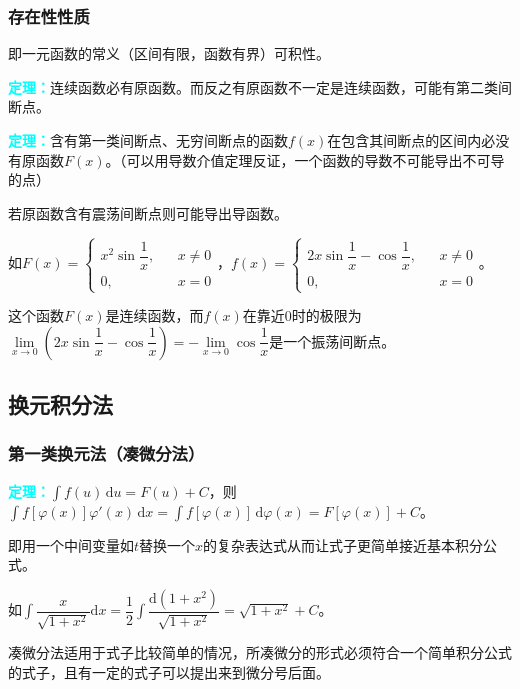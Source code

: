 \documentclass[UTF8, 12pt]{ctexart}
\begin{document}
\subsubsection{存在性性质}

即一元函数的常义（区间有限，函数有界）可积性。

\textcolor{aqua}{\textbf{定理：}}连续函数必有原函数。而反之有原函数不一定是连续函数，可能有第二类间断点。

\textcolor{aqua}{\textbf{定理：}}含有第一类间断点、无穷间断点的函数$f(x)$在包含其间断点的区间内必没有原函数$F(x)$。（可以用导数介值定理反证，一个函数的导数不可能导出不可导的点）

若原函数含有震荡间断点则可能导出导函数。

如$F(x)=\left\{\begin{array}{lcl}
    x^2\sin\dfrac{1}{x}, & & x\neq 0 \\
    0, & & x=0
\end{array}\right.$，$f(x)=\left\{\begin{array}{lcl}
    2x\sin\dfrac{1}{x}-\cos\dfrac{1}{x}, & & x\neq 0 \\
    0, & & x=0
\end{array}\right.$。

这个函数$F(x)$是连续函数，而$f(x)$在靠近0时的极限为$\lim\limits_{x\to 0}(2x\sin\dfrac{1}{x}-\cos\dfrac{1}{x})=-\lim\limits_{x\to 0}\cos\dfrac{1}{x}$是一个振荡间断点。

\subsection{换元积分法}

\subsubsection{第一类换元法（凑微分法）}

\textcolor{aqua}{\textbf{定理：}}$\int f(u)\,\textrm{d}u=F(u)+C$，则$\int f[\varphi(x)]\varphi'(x)\,\textrm{d}x=\int f[\varphi(x)]\,\textrm{d}\varphi(x)=F[\varphi(x)]+C$。

即用一个中间变量如$t$替换一个$x$的复杂表达式从而让式子更简单接近基本积分公式。

如$\displaystyle{\int\dfrac{x}{\sqrt{1+x^2}}\textrm{d}x=\dfrac{1}{2}\int\dfrac{\textrm{d}(1+x^2)}{\sqrt{1+x^2}}}=\sqrt{1+x^2}+C$。\medskip

凑微分法适用于式子比较简单的情况，所凑微分的形式必须符合一个简单积分公式的式子，且有一定的式子可以提出来到微分号后面。
\end{document}
